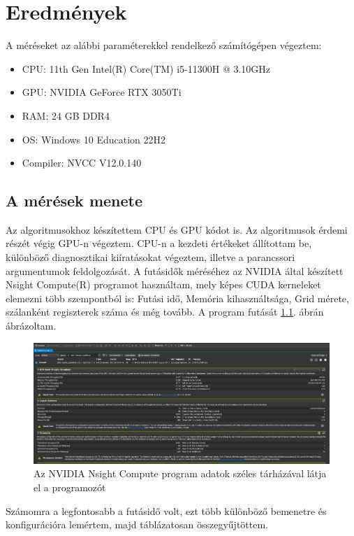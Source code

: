 \chapter{Eredmények}

A méréseket az alábbi paraméterekkel rendelkező számítógépen végeztem:
\begin{itemize}
	\item	CPU: 11th Gen Intel(R) Core(TM) i5-11300H @ 3.10GHz
	\item	GPU: NVIDIA GeForce RTX 3050Ti 
	\item	RAM: 24 GB DDR4 
	\item	OS: Windows 10 Education 22H2 
	\item	Compiler: NVCC V12.0.140
	
\end{itemize}

\section{A mérések menete}
Az algoritmusokhoz készítettem CPU és GPU kódot is. Az algoritmusok érdemi részét végig GPU-n végeztem. CPU-n a kezdeti értékeket állítottam be, különböző diagnosztikai kiíratásokat végeztem, illetve a parancssori argumentumok feldolgozását. A futásidők méréséhez az NVIDIA által készített Nsight Compute(R) programot használtam, mely képes CUDA kerneleket elemezni több szempontból is: Futási idő, Memória kihasználtsága, Grid mérete, szálanként regiszterek száma és még tovább. A program futását \ref{fig:nsight-compute}. ábrán ábrázoltam. 

\begin{figure}[ht!]
	\centering
	\includegraphics[width=150mm, keepaspectratio]{figures/nsight-compute.png}
	\caption{Az NVIDIA Nsight Compute program adatok széles tárházával látja el a programozót }
	\label{fig:nsight-compute}
\end{figure}

Számomra a legfontosabb a futásidő volt, ezt több különböző bemenetre és konfigurációra lemértem, majd táblázatosan összegyűjtöttem.

